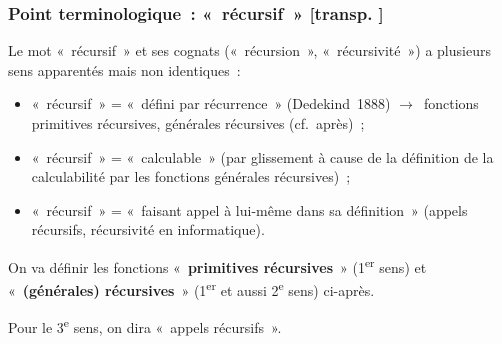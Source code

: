 \documentclass[mathserif,a4paper,aspectratio=169]{beamer}
\renewcommand{\frametitle}[1]{\subsubsection*{#1 {\footnotesize[transp. \insertframenumber]}}}
\begin{document}
\begin{frame}
\frametitle{Point terminologique : « récursif »}

Le mot « récursif » et ses cognats (« récursion », « récursivité ») a
plusieurs sens \alert{apparentés mais non identiques} :
\begin{itemize}
\item « récursif » = « défini par récurrence » (Dedekind 1888)
  $\rightarrow$ fonctions primitives récursives, générales
  récursives (cf. après) ;
\item « récursif » = « calculable » (par glissement à cause de la
  définition de la calculabilité par les fonctions générales
  récursives) ;
\item « récursif » = « faisant appel à lui-même dans sa définition »
  (appels récursifs, récursivité en informatique).
\end{itemize}

\bigskip

On va définir les fonctions « \textbf{primitives récursives} »
(1\textsuperscript{er} sens) et « \textbf{(générales) récursives} »
(1\textsuperscript{er} et aussi 2\textsuperscript{e} sens) ci-après.

\medskip

Pour le 3\textsuperscript{e} sens, on dira « appels récursifs ».

\end{frame}
%
\end{document}
